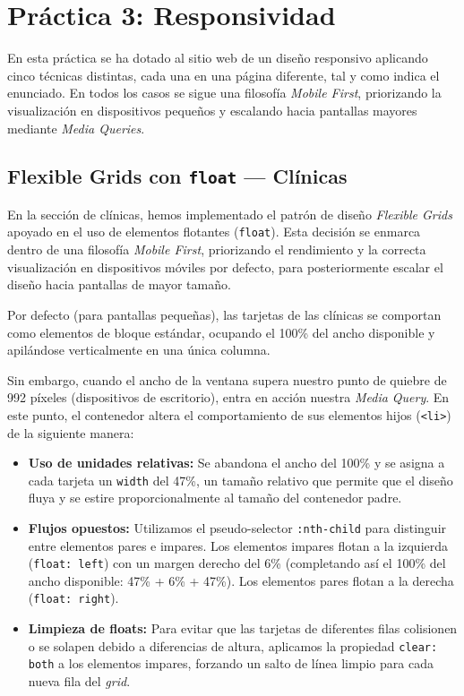 \documentclass[11pt]{article}
\begin{document}
\section{Práctica 3: Responsividad}

En esta práctica se ha dotado al sitio web de un diseño responsivo aplicando cinco técnicas distintas, cada una en una página diferente, tal y como indica el enunciado. En todos los casos se sigue una filosofía \textit{Mobile First}, priorizando la visualización en dispositivos pequeños y escalando hacia pantallas mayores mediante \textit{Media Queries}.

\subsection{Flexible Grids con \texttt{float} --- Clínicas}

En la sección de clínicas, hemos implementado el patrón de diseño \textit{Flexible Grids} apoyado en el uso de elementos flotantes (\texttt{float}). Esta decisión se enmarca dentro de una filosofía \textit{Mobile First}, priorizando el rendimiento y la correcta visualización en dispositivos móviles por defecto, para posteriormente escalar el diseño hacia pantallas de mayor tamaño.

Por defecto (para pantallas pequeñas), las tarjetas de las clínicas se comportan como elementos de bloque estándar, ocupando el 100\% del ancho disponible y apilándose verticalmente en una única columna.

Sin embargo, cuando el ancho de la ventana supera nuestro punto de quiebre de 992 píxeles (dispositivos de escritorio), entra en acción nuestra \textit{Media Query}. En este punto, el contenedor altera el comportamiento de sus elementos hijos (\texttt{<li>}) de la siguiente manera:

\begin{itemize}
    \item \textbf{Uso de unidades relativas:} Se abandona el ancho del 100\% y se asigna a cada tarjeta un \texttt{width} del 47\%, un tamaño relativo que permite que el diseño fluya y se estire proporcionalmente al tamaño del contenedor padre.
    \item \textbf{Flujos opuestos:} Utilizamos el pseudo-selector \texttt{:nth-child} para distinguir entre elementos pares e impares. Los elementos impares flotan a la izquierda (\texttt{float: left}) con un margen derecho del 6\% (completando así el 100\% del ancho disponible: 47\% + 6\% + 47\%). Los elementos pares flotan a la derecha (\texttt{float: right}).
    \item \textbf{Limpieza de floats:} Para evitar que las tarjetas de diferentes filas colisionen o se solapen debido a diferencias de altura, aplicamos la propiedad \texttt{clear: both} a los elementos impares, forzando un salto de línea limpio para cada nueva fila del \textit{grid}.
\end{itemize}
\end{document}
